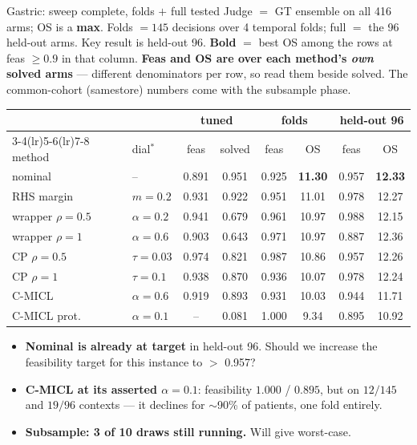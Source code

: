 \documentclass{beamer}
\begin{document}
\begin{frame}{Gastric: sweep complete, folds $+$ full tested}
    \scriptsize
    Judge $=$ GT ensemble on all 416 arms; OS is a \textbf{max}. Folds $=145$
    decisions over 4 temporal folds; full $=$ the 96 held-out arms. Key result is held-out 96.
    \textbf{Bold} $=$ best OS among the rows at feas $\ge0.9$ in that column.
    \textbf{Feas and OS are over each method's \emph{own} solved arms} ---
    different denominators per row, so read them beside solved. The common-cohort
    (samestore) numbers come with the subsample phase.
    {\scriptsize\setlength{\tabcolsep}{3pt}
    \begin{tabular}{llcc|cc|cc}
        \toprule
        & & \multicolumn{2}{c|}{tuned} & \multicolumn{2}{c|}{folds}
          & \multicolumn{2}{c}{held-out 96} \\
        \cmidrule(lr){3-4}\cmidrule(lr){5-6}\cmidrule(lr){7-8}
        method & dial$^\ast$ & feas & solved & feas & OS & feas & OS \\
        \midrule
        nominal              & --           & 0.891 & 0.951 & 0.925 & \textbf{11.30} & 0.957 & \textbf{12.33} \\
        RHS margin           & $m=0.2$      & 0.931 & 0.922 & 0.951 & 11.01 & 0.978 & 12.27 \\
        wrapper $\rho{=}0.5$ & $\alpha=0.2$ & 0.941 & 0.679 & 0.961 & 10.97 & 0.988 & 12.15 \\
        wrapper $\rho{=}1$   & $\alpha=0.6$ & 0.903 & 0.643 & 0.971 & 10.97 & 0.887 & 12.36 \\
        CP $\rho{=}0.5$      & $\tau=0.03$  & 0.974 & 0.821 & 0.987 & 10.86 & 0.957 & 12.26 \\
        CP $\rho{=}1$        & $\tau=0.1$   & 0.938 & 0.870 & 0.936 & 10.07 & 0.978 & 12.24 \\
        C-MICL               & $\alpha=0.6$ & 0.919 & 0.893 & 0.931 & 10.03 & 0.944 & 11.71 \\
        C-MICL prot.         & $\alpha=0.1$ & --    & 0.081 & 1.000 & 9.34  & 0.895 & 10.92 \\
        \bottomrule
    \end{tabular}}
    \begin{itemize}\scriptsize
        \item \textbf{Nominal is already at target} in held-out 96. 
            Should we increase the feasibility target for this instance to $>$ 0.957?
        \item \textbf{C-MICL at its asserted $\alpha{=}0.1$}: feasibility
              $1.000$ / $0.895$, but on $12/145$ and $19/96$ contexts --- it
              declines for $\sim$90\% of patients, one fold entirely.
        \item \textbf{Subsample: 3 of 10 draws still running.} Will give worst-case.
    \end{itemize}
\end{frame}
\end{document}
